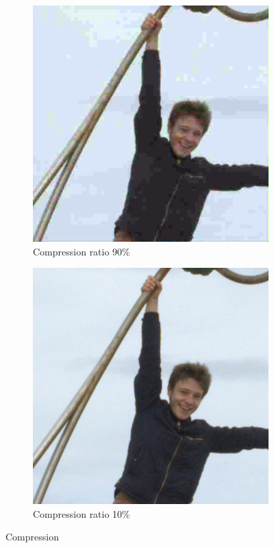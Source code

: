 \begin{figure}[H]
    \centering
    \begin{subfigure}[t]{0.4\textwidth}
        \centering
        \includegraphics[width=\linewidth]{src/assets/tests/reconstructed_0.9.png}
        \caption{Compression ratio 90\%}
        \label{fig:tests-comp-0.1}
    \end{subfigure}
    \hfill
    \begin{subfigure}[t]{0.4\textwidth}
        \centering
        \includegraphics[width=\linewidth]{src/assets/tests/reconstructed_0.1.png}
        \caption{Compression ratio 10\%}
        \label{fig:tests-comp-0.9}
    \end{subfigure}


    \caption{Compression}
    \label{fig:tests-comp}
\end{figure}

